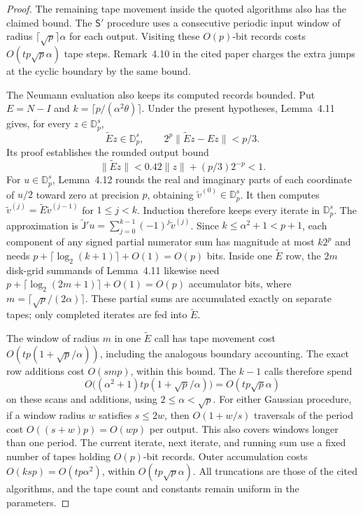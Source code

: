 \begin{proof}
The remaining tape movement inside the quoted algorithms also has the
claimed bound. The $\mathsf S'$ procedure uses a consecutive periodic input
window of radius $\lceil\sqrt p\rceil\alpha$ for each output. Visiting
these $O(p)$-bit records costs $O(tp\sqrt p\alpha)$ tape steps.
Remark~4.10 in the cited paper charges the extra jumps at the cyclic
boundary by the same bound.

The Neumann evaluation also keeps its computed records bounded.
Put $E=N-I$ and $k=\lceil p/(\alpha^2\theta)\rceil$. Under the present
hypotheses, Lemma~4.11 gives, for every $z\in\mathbb D_p^s$,
\[
 \widetilde E z\in\mathbb D_p^s,\qquad
 2^p\|\widetilde E z-Ez\|<p/3.
\]
Its proof establishes the rounded output bound
\[
 \|\widetilde E z\|<0.42\|z\|+(p/3)2^{-p}<1.
\]
For $u\in\mathbb D_p^s$, Lemma~4.12 rounds the real and imaginary parts
of each coordinate of $u/2$ toward zero at precision $p$, obtaining
$\widetilde v^{(0)}\in\mathbb D_p^s$. It then computes
$\widetilde v^{(j)}=\widetilde E\widetilde v^{(j-1)}$
for $1\leq j<k$. Induction therefore keeps every iterate in
$\mathbb D_p^s$. The approximation is
$\widetilde{\mathsf J}'u=\sum_{j=0}^{k-1}(-1)^j\widetilde v^{(j)}$.
Since $k\leq\alpha^2+1<p+1$, each component of any signed partial
numerator sum has magnitude at most $k2^p$ and needs
$p+\lceil\log_2(k+1)\rceil+O(1)=O(p)$ bits. Inside one $\widetilde E$
row, the $2m$ disk-grid summands of Lemma~4.11 likewise need
$p+\lceil\log_2(2m+1)\rceil+O(1)=O(p)$ accumulator bits, where
$m=\lceil\sqrt p/(2\alpha)\rceil$. These partial sums are accumulated
exactly on separate tapes; only completed iterates are fed into
$\widetilde E$.

The window of radius $m$ in one $\widetilde E$ call has tape movement
cost $O(tp(1+\sqrt p/\alpha))$, including the analogous boundary
accounting. The exact row additions cost $O(smp)$, within this bound.
The $k-1$ calls therefore spend
\[
 O\bigl((\alpha^2+1)tp(1+\sqrt p/\alpha)\bigr)
 =O(tp\sqrt p\alpha)
\]
on these scans and additions, using $2\leq\alpha<\sqrt p$.
For either Gaussian procedure, if a window
radius $w$ satisfies $s\leq2w$, then $O(1+w/s)$ traversals of the period
cost $O((s+w)p)=O(wp)$ per output. This also covers windows longer than
one period. The current iterate, next iterate, and running sum use a
fixed number of tapes holding $O(p)$-bit records. Outer accumulation
costs $O(ksp)=O(tp\alpha^2)$, within $O(tp\sqrt p\alpha)$.
All truncations are those of the cited algorithms, and the tape count
and constants remain uniform in the parameters.
\end{proof}

